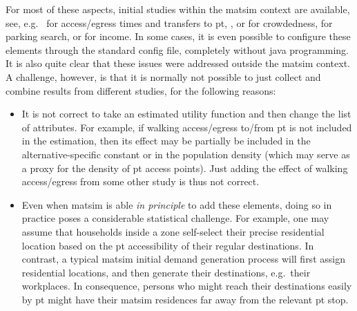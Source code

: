 For most of these aspects, initial studies within the \gls{matsim} context are available, see, e.g.\ 
%
\citet{MoyoNagelptLineCalibration,MoyoNagelptNetCalibration} for access/egress times and transfers to \acrfull{pt}, 
%
\citet{BoumanEtc2013Crowdedness},
\citet[][]{SunEtAl_TechRep_IVT_2014}
or \citet{erath_using_smartcard_data}
for crowdedness,
%
\cite{WaraichEtAl_STRC_2013} for parking search,
%
or \cite{KickhoeferEtAl_Transportation_2011} for income.
%
In some cases, it is even possible to configure these elements through the standard config file, completely without \gls{java} programming.
%
It is also quite clear that these issues were addressed outside the \gls{matsim} context.
%
A challenge, however, is that it is normally not possible to just collect and combine results from different studies, for the following reasons:
\begin{itemize}

\item It is not correct to take an estimated utility function and then change the list of attributes.  
%
For example, if walking access/egress to/from \gls{pt} is not included in the estimation, then its effect may be partially be included in the alternative-specific constant or in the population density (which may serve as a proxy for the density of \gls{pt} access points).  Just adding the effect of walking access/egress from some other study is thus not correct.

\item Even when \gls{matsim} is able \emph{in principle} to add these elements, doing so in practice poses a considerable statistical challenge.  For example, one may assume that households inside a zone self-select their precise residential location based on the \gls{pt} accessibility of their regular destinations.  
%
In contrast, a typical \gls{matsim} initial demand generation process will first assign residential locations, and then generate their destinations, e.g.\ their workplaces.
%
In consequence, persons who might reach their destinations easily by \gls{pt} might have their \gls{matsim} residences far away from the relevant \gls{pt} stop.

\end{itemize}

